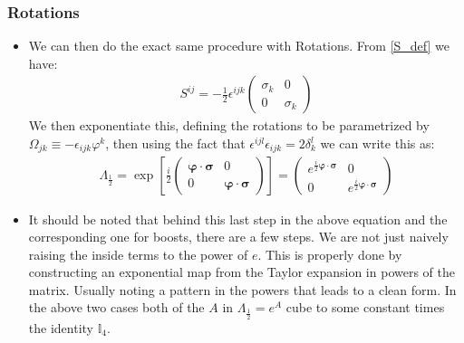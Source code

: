\documentclass[11pt]{article}
\numberwithin{equation}{section}
\begin{document}
   \subsubsection{Rotations}
   \begin{itemize}
     \item We can then do the exact same procedure with Rotations. From \ref{S_def} we have:
     \begin{align*}
       S^{ij} = -\frac{1}{2}\epsilon^{ijk}\begin{pmatrix}
        \sigma_{k} & 0 \\
        0 & \sigma_{k} 
       \end{pmatrix}
     \end{align*}
     We then exponentiate this, defining the rotations to be parametrized by $\Omega_{jk} \equiv -\epsilon_{ijk}\varphi^k $, then using the fact that $\epsilon^{ijl}\epsilon_{ijk} = 2\delta_{k}^{l}$ we can write this as: 
      \begin{align}
      \label{L_rot}
      \Lambda_{\frac{1}{2}} = \exp \left[ \frac{i}{2}\begin{pmatrix}
        \boldsymbol{\varphi}\cdot \boldsymbol{\sigma} & 0 \\
        0 & \boldsymbol{\varphi} \cdot \boldsymbol{\sigma}
      \end{pmatrix}\right] = \begin{pmatrix}
        e^{\frac{i}{2}\boldsymbol{\varphi}\cdot \boldsymbol{\sigma}} & 0 \\
        0 & e^{\frac{i}{2}\boldsymbol{\varphi}\cdot \boldsymbol{\sigma}}
      \end{pmatrix}
    \end{align}
  \item It should be noted that behind this last step in the above equation and the corresponding one for boosts, there are a few steps. We are not just naively raising the inside terms to the power of $e$. This is properly done by constructing an exponential map from the Taylor expansion in powers of the matrix. Usually noting a pattern in the powers that leads to a clean form. In the above two cases both of the $A$ in $\Lambda_{\frac{1}{2}}=e^{A}$ cube to some constant times the identity $\mathbb{I}_4$.
   \end{itemize}
\end{document}
